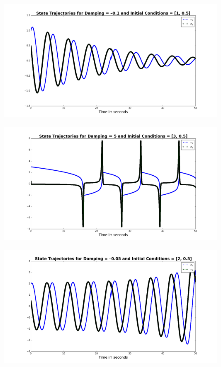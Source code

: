 \documentclass[11pt]{article}
\begin{document}
\begin{figure}[H]
\centering
\includegraphics[scale=0.35]{output/vanderpol_trajectories0}
\end{figure}
\begin{figure}[H]
\centering
\includegraphics[scale=0.35]{output/vanderpol_trajectories1}
\end{figure}
\begin{figure}[H]
\centering
\includegraphics[scale=0.35]{output/vanderpol_trajectories2}
\end{figure}
\end{document}
